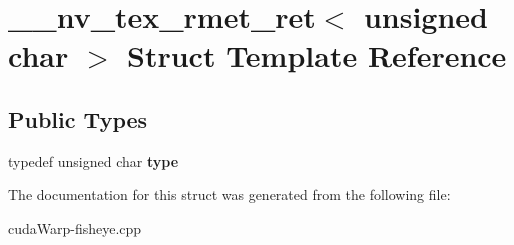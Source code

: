\hypertarget{struct____nv__tex__rmet__ret_3_01unsigned_01char_01_4}{}\section{\+\_\+\+\_\+nv\+\_\+tex\+\_\+rmet\+\_\+ret$<$ unsigned char $>$ Struct Template Reference}
\label{struct____nv__tex__rmet__ret_3_01unsigned_01char_01_4}
\subsection*{Public Types}
\begin{DoxyCompactItemize}
\item 
typedef unsigned char {\bfseries type}\hypertarget{struct____nv__tex__rmet__ret_3_01unsigned_01char_01_4_af31a77a8c50085ea411977123ef27287}{}\label{struct____nv__tex__rmet__ret_3_01unsigned_01char_01_4_af31a77a8c50085ea411977123ef27287}

\end{DoxyCompactItemize}


The documentation for this struct was generated from the following file\+:\begin{DoxyCompactItemize}
\item 
cuda\+Warp-\/fisheye.\+cpp\end{DoxyCompactItemize}
